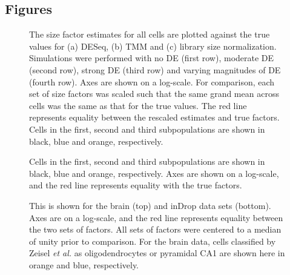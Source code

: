 \documentclass{bmcart}
\begin{document}
\begin{backmatter}


\section*{Figures}
\begin{figure}[!h]
\caption{
    The size factor estimates for all cells are plotted against the true values for (a) DESeq,
        (b) TMM and (c) library size normalization.
    Simulations were performed with no DE (first row), moderate DE (second row), strong DE (third row) and varying magnitudes of DE (fourth row).
    Axes are shown on a log-scale.
    For comparison, each set of size factors was scaled such that the same grand mean across cells was the same as that for the true values.
    The red line represents equality between the rescaled estimates and true factors.
    Cells in the first, second and third subpopulations are shown in black, blue and orange, respectively.
}
\label{fig:existing_sim}
\end{figure}

\begin{figure}[!h]
\caption{
    Cells in the first, second and third subpopulations are shown in black, blue and orange, respectively.
    Axes are shown on a log-scale, and the red line represents equality with the true factors.
}
\label{fig:sim_cluster_DE}
\end{figure}

\begin{figure}[!h]
\caption{
    This is shown for the brain (top) and inDrop data sets (bottom).
    Axes are on a log-scale, and the red line represents equality between the two sets of factors.
    All sets of factors were centered to a median of unity prior to comparison.
    For the brain data, cells classified by Zeisel \textit{et al.} as oligodendrocytes or pyramidal CA1 are shown here in orange and blue, respectively.
}   
\label{fig:real_comp}
\end{figure}



\end{backmatter}
\end{document}
